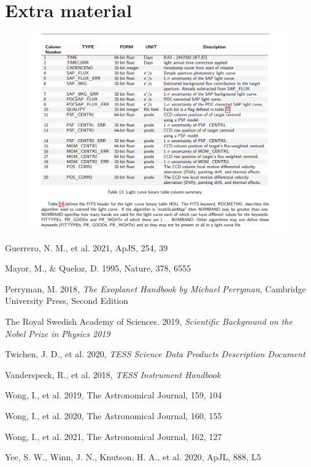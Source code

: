 \documentclass{article}
\begin{document}
\section{Extra material}

\begin{figure}[H]
    \centering
    \includegraphics[width=0.8\linewidth]{image/EXM_Table13.jpg}
    \label{fig:table13}
\end{figure}

\newpage
{}
\begin{thebibliography}{}

 Guerrero, N. M., et al. 2021, ApJS, 254, 39

 Mayor, M., \& Queloz, D. 1995, Nature, 378, 6555

 Perryman, M. 2018, \textit{The Exoplanet Handbook by Michael Perryman}, Cambridge University Press, Second Edition

 The Royal Swedish Academy of Sciences. 2019, \textit{Scientific Background on the Nobel Prize in Physics 2019}

 Twichen, J. D., et al. 2020, \textit{TESS Science Data Products Description Document}

 Vanderspeck, R., et al. 2018, \textit{TESS Instrument Handbook}


 Wong, I., et al. 2019, The Astronomical Journal, 159, 104


 Wong, I., et al. 2020, The Astronomical Journal, 160, 155

 Wong, I., et al. 2021, The Astronomical Journal, 162, 127

 Yee, S. W., Winn, J. N., Knutson, H. A., et al. 2020, ApJL, 888, L5

\end{thebibliography}
\end{document}
